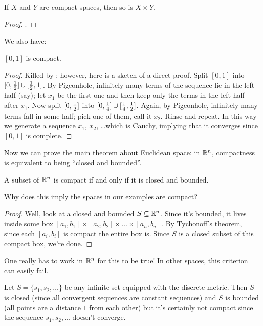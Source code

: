 \begin{theorem}
	\label{thm:tychonoff}
	If $X$ and $Y$ are compact spaces, then so is $X \times Y$.
\end{theorem}
\begin{proof}
	.
\end{proof}

We also have:
\begin{theorem}
	\label{thm:interval_compact}
	$[0,1]$ is compact.
\end{theorem}
\begin{proof}
	Killed by ;
	however, here is a sketch of a direct proof.
	Split $[0,1]$ into $[0,\frac{1}{2}] \cup [\frac{1}{2},1]$.
	By Pigeonhole, infinitely many terms of the sequence lie in the left half (say);
	let $x_1$ be the first one and then keep only the terms in the left half after $x_1$.
	Now split $[0, \frac{1}{2}]$ into $[0,\frac14] \cup [\frac14,\frac{1}{2}]$.
	Again, by Pigeonhole, infinitely many terms fall in some half; pick one of them, call it $x_2$.
	Rinse and repeat.
	In this way we generate a sequence $x_1$, $x_2$, \dots which is Cauchy,
	implying that it converges since $[0,1]$ is complete.
\end{proof}

Now we can prove the main theorem about Euclidean space:
in $\mathbb R^n$, compactness is equivalent to being ``closed and bounded''.
\begin{theorem}
	A subset of $\mathbb R^n$ is compact if and only if it is closed and bounded.
	\label{thm:fakeBW}
\end{theorem}
\begin{ques}
	Why does this imply the spaces in our examples are compact?
\end{ques}
\begin{proof}
	Well, look at a closed and bounded $S \subseteq \mathbb R^n$.
	Since it's bounded, it lives inside some box $[a_1, b_1] \times [a_2, b_2] \times \dots \times [a_n, b_n]$.
	By Tychonoff's theorem, since each $[a_i, b_i]$ is compact the entire box is.
	Since $S$ is a closed subset of this compact box, we're done.
\end{proof}

One really has to work in $\mathbb R^n$ for this to be true!
In other spaces, this criterion can easily fail.
\begin{example}
	Let $S = \{s_1, s_2, \dots\}$ be any infinite set equipped with the discrete metric.
	Then $S$ is closed (since all convergent sequences are constant sequences)
	and $S$ is bounded (all points are a distance $1$ from each other)
	but it's certainly not compact since the sequence $s_1, s_2, \dots$ doesn't converge.
\end{example}

